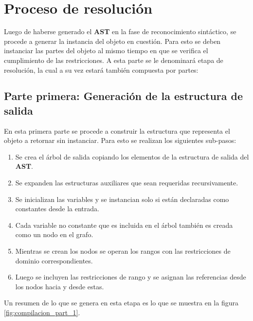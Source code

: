 
\section{Proceso de resolución}
Luego de haberse generado el \textbf{AST} en la fase de reconocimiento sintáctico, se procede a generar
la instancia del objeto en cuestión. Para esto se deben instanciar las partes 
del objeto al mismo tiempo en que se verifica el cumplimiento de las 
restricciones. A esta parte se le denominará etapa de resolución, la cual a su vez 
estará también compuesta por partes:

\subsection{Parte primera: Generación de la estructura de salida}
En esta primera parte se procede a construir la estructura que representa el 
objeto a retornar sin instanciar. Para esto se realizan los siguientes sub-pasos:

\begin{enumerate}
 \item {Se crea el árbol de salida copiando los elementos de la estructura de 
  salida del \textbf{AST}.}
 \item {Se expanden las estructuras auxiliares que sean requeridas recursivamente.}
 \item {Se inicializan las variables y se instancian solo si están declaradas 
  como constantes desde la entrada.}
 \item {Cada variable no constante que es incluida en el árbol también es 
  creada como un nodo en el grafo.}
 \item {Mientras se crean los nodos se operan los rangos con las restricciones de 
  dominio correspondientes.}
 \item {Luego se incluyen las restricciones de rango y se asignan las referencias 
  desde los nodos hacia y desde estas.}
\end{enumerate}

Un resumen de lo que se genera en esta etapa es lo que se muestra en la figura
\ref{fig:compilacion_part_1}.

